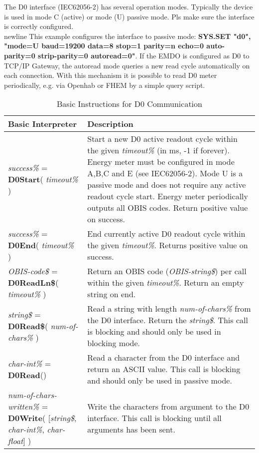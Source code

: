 The D0 interface (IEC62056-2) has several operation modes. Typically the device is used in mode C (active) or mode (U) passive mode. Pls make sure the interface is correctly configured.\\newline
This example configures the interface to passive mode: \newline
\textbf{SYS.SET "d0", "mode=U baud=19200 data=8 stop=1 parity=n echo=0 auto-parity=0 strip-parity=0 autoread=0"}.\newline
If the EMDO is configured as D0 to TCP/IP Gateway, the autoread mode queries a new read cycle automatically on each connection. With this mechanism it is possible to read D0 meter periodically, e.g. via Openhab or FHEM by a simple query script.

\begin{table}[h!]
\centering
\caption{Basic Instructions for D0 Communication}
\label{Basic_Instructions_for_D0_Communication}
\begin{tabular}{|p{4cm}|p{10cm}|}
\hline
\textbf{Basic Interpreter} & \textbf{Description}
\\ \hline
\textit{success\%} = \textbf{D0Start}( \textit{ timeout\%} )\newline
& Start a new D0 active readout cycle within the given \textit{timeout\%} (in ms, -1 if forever). Energy meter must be configured in mode A,B,C and E (see IEC62056-2). Mode U is a passive mode and does not require any active readout cycle start. Energy meter periodically outputs all OBIS codes. Return positive value on success. 
\\ \hline
\textit{success\%} = \textbf{D0End}( \textit{ timeout\%} )\newline
& End currently active D0 readout cycle within the given \textit{timeout\%}. Returns positive value on success.
\\ \hline
\textit{OBIS-code\$} = \textbf{D0ReadLn\$}(\textit{ timeout\%} )\newline
& Return an OBIS code (\textit{OBIS-string\$}) per call within the given \textit{timeout\%}. Return an empty string on end.
\\ \hline
\textit{string\$} = \textbf{D0Read\$}(\textit{ num-of-chars\%} )\newline
& Read a string with length \textit{ num-of-chars\%} from the D0 interface. Return the \textit{string\$}. This call is blocking and should only be used in blocking mode.
\\ \hline

\textit{char-int\%} = \textbf{D0Read}()\newline
& Read a character from the D0 interface and return an ASCII value. This call is blocking and should only be used in passive mode. 
\\ \hline

\textit{num-of-chars-written\%} = \textbf{D0Write}( [\textit{string\$}, \textit{char-int\%}, \textit{char-float}] )\newline
& Write the characters from argument to the D0 interface. This call is blocking until all arguments has been sent.
\\ \hline
\end{tabular}
\end{table}

